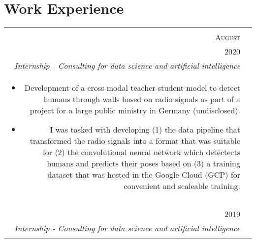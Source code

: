 \documentclass[a4paper,10pt]{article}
\begin{document}
\section{Work Experience}
\begin{tabularx}{\textwidth}{ r | X }

  \begin{tabular}{r}
      \textsc{July \&} \\
      \textsc{August} \\
      \textsc{2020}
  \end{tabular} &

  \begin{tabular}{p{}}
    \textsc{Atos} \\
    \emph{Internship - Consulting for data science and artificial intelligence} \\
    \vspace{-2mm}
    \begin{itemize}[leftmargin=*]

      \item Development of a cross-modal teacher-student model to detect
          humans through walls based on radio signals as part of a project for
          a large public ministry in Germany (undisclosed).

      \item I was tasked with developing (1) the data pipeline that
          transformed the radio signals into a format that was suitable for
          (2) the convolutional neural network which detectects humans and
          predicts their poses based on (3) a training dataset that was hosted
          in the Google Cloud (GCP) for convenient and scaleable training.

    \end{itemize}
  \end{tabular}
  \vspace{-6mm} \\
  \multicolumn{2}{c}{} \\

  \begin{tabular}{r}
      \textsc{September} \\
      \textsc{2019}
  \end{tabular} &

  \begin{tabular}{p{}}
    \textsc{Atos} \\
    \emph{Internship - Consulting for data science and artificial intelligence} \\
    \vspace{-2mm}
    \begin{itemize}[leftmargin=*]


\end{itemize}
\end{tabular}
\end{tabularx}
\end{document}
